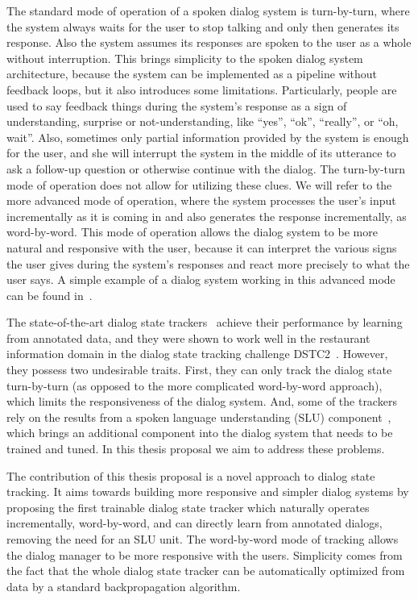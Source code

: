 \documentclass[runningheads,a4paper]{llncs}
\begin{document}
The standard mode of operation of a spoken dialog system is turn-by-turn, where the system always waits for the user to stop talking and only then generates its response. Also the system assumes its responses are spoken to the user as a whole without interruption. This brings simplicity to the spoken dialog system architecture, because the system can be implemented as a pipeline without feedback loops, but it also introduces some limitations. Particularly, people are used to say feedback things during the system's response as a sign of understanding, surprise or not-understanding, like ``yes'', ``ok'', ``really'', or ``oh, wait''. Also, sometimes only partial information provided by the system is enough for the user, and she will interrupt the system in the middle of its utterance to ask a follow-up question or otherwise continue with the dialog. The turn-by-turn mode of operation does not allow for utilizing these clues. We will refer to the more advanced mode of operation, where the system processes the user's input incrementally as it is coming in and also generates the response incrementally, as word-by-word. This mode of operation allows the dialog system to be more natural and responsive with the user, because it can interpret the various signs the user gives during the system's responses and react more precisely to what the user says. A simple example of a dialog system working in this advanced mode can be found in~\cite{skantze2009incremental}.

The state-of-the-art dialog state trackers~\cite{williams2014web,henderson2014word,lee2014optimizing,smith2014comparative,sun2014sjtu} achieve their performance by learning from annotated data, and they were shown to work well in the restaurant information domain in the dialog state tracking challenge DSTC2~\cite{henderson2014second}. However, they possess two undesirable traits. First, they can only track the dialog state turn-by-turn (as opposed to the more complicated word-by-word approach), which limits the responsiveness of the dialog system. And, some of the trackers rely on the results from a spoken language understanding (SLU) component~\cite{wang2005spoken}, which brings an additional component into the dialog system that needs to be trained and tuned. In this thesis proposal we aim to address these problems.

The contribution of this thesis proposal is a novel approach to dialog state tracking.
It aims towards building more responsive and simpler dialog systems by proposing the first trainable dialog state tracker which naturally operates incrementally, word-by-word, and can directly learn from annotated dialogs, removing the need for an SLU unit. The word-by-word mode of tracking allows the dialog manager to be more responsive with the users. Simplicity comes from the fact that the whole dialog state tracker can be automatically optimized from data by a standard backpropagation algorithm.
\end{document}
